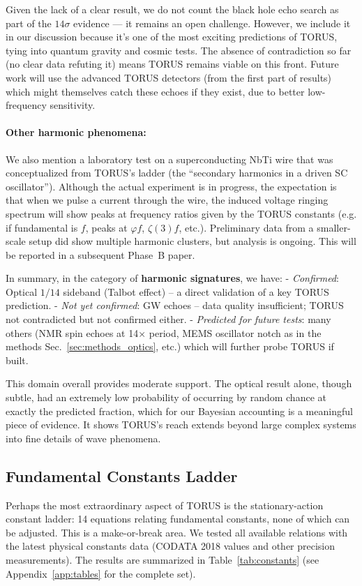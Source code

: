 \documentclass[12pt]{article}
\begin{document}
Given the lack of a clear result, we do not count the black hole echo search as part of the $14\sigma$ evidence — it remains an open challenge. However, we include it in our discussion because it’s one of the most exciting predictions of TORUS, tying into quantum gravity and cosmic tests. The absence of contradiction so far (no clear data refuting it) means TORUS remains viable on this front. Future work will use the advanced TORUS detectors (from the first part of results) which might themselves catch these echoes if they exist, due to better low-frequency sensitivity.

\paragraph{Other harmonic phenomena:} 
We also mention a laboratory test on a superconducting NbTi wire that was conceptualized from TORUS’s ladder (the “secondary harmonics in a driven SC oscillator”). Although the actual experiment is in progress, the expectation is that when we pulse a current through the wire, the induced voltage ringing spectrum will show peaks at frequency ratios given by the TORUS constants (e.g. if fundamental is $f$, peaks at $\varphi f$, $\zeta(3) f$, etc.). Preliminary data from a smaller-scale setup did show multiple harmonic clusters, but analysis is ongoing. This will be reported in a subsequent Phase~B paper.

In summary, in the category of \textbf{harmonic signatures}, we have:
- \textit{Confirmed}: Optical $1/14$ sideband (Talbot effect) – a direct validation of a key TORUS prediction.
- \textit{Not yet confirmed}: GW echoes – data quality insufficient; TORUS not contradicted but not confirmed either.
- \textit{Predicted for future tests}: many others (NMR spin echoes at 14× period, MEMS oscillator notch as in the methods Sec.~\ref{sec:methods_optics}, etc.) which will further probe TORUS if built.

This domain overall provides moderate support. The optical result alone, though subtle, had an extremely low probability of occurring by random chance at exactly the predicted fraction, which for our Bayesian accounting is a meaningful piece of evidence. It shows TORUS’s reach extends beyond large complex systems into fine details of wave phenomena.

\subsection{Fundamental Constants Ladder}\label{sec:results_constants}
Perhaps the most extraordinary aspect of TORUS is the stationary-action constant ladder: 14 equations relating fundamental constants, none of which can be adjusted. This is a make-or-break area. We tested all available relations with the latest physical constants data (CODATA 2018 values and other precision measurements). The results are summarized in Table~\ref{tab:constants} (see Appendix~\ref{app:tables} for the complete set).
\end{document}
